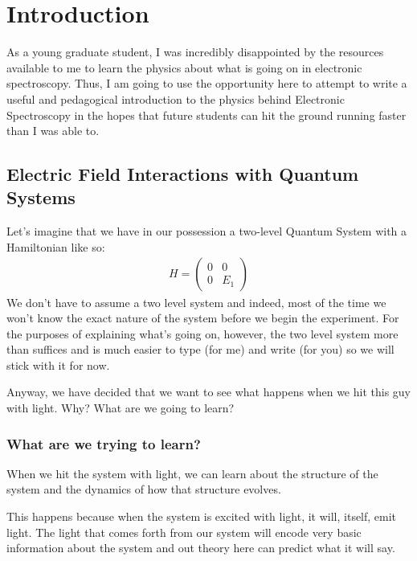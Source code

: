 \chapter{Introduction}
\newcommand{\doublemu}{ \vec{\mu} \boldsymbol{\mu}  }

As a young graduate student, I was incredibly disappointed by the resources available to me to learn the physics about what is going on in electronic spectroscopy.  Thus, I am going to use the opportunity here to attempt to write a useful and pedagogical introduction to the physics behind Electronic Spectroscopy in the hopes that future students can hit the ground running faster than I was able to.

\section{Electric Field Interactions with Quantum Systems}
Let's imagine that we have in our possession a two-level Quantum System with a Hamiltonian like so:
\begin{align}
	H = \left( \begin{array}{ccc}
		0 & 0 \\
		0 & E_1 \end{array} \right)
\end{align}
We don't have to assume a two level system and indeed, most of the time we won't know the exact nature of the system before we begin the experiment.  For the purposes of explaining what's going on, however, the two level system more than suffices and is much easier to type (for me) and write (for you) so we will stick with it for now.

Anyway, we have decided that we want to see what happens when we hit this guy with light.  Why?  What are we going to learn?

\subsection{What are we trying to learn?}
When we hit the system with light, we can learn about the structure of the system and the dynamics of how that structure evolves.

This happens because when the system is excited with light, it will, itself, emit light.  The light that comes forth from our system will encode very basic information about the system and out theory here can predict what it will say.

